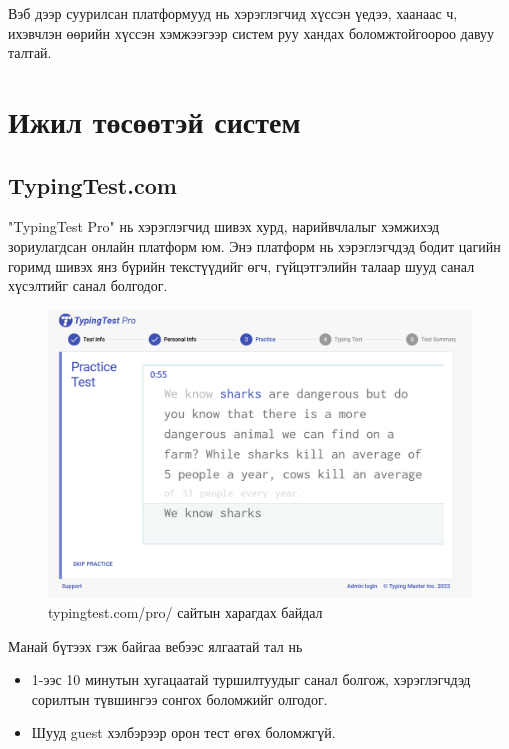 Вэб дээр суурилсан платформууд нь хэрэглэгчид хүссэн үедээ, хаанаас ч, ихэвчлэн өөрийн хүссэн хэмжээгээр систем руу хандах боломжтойгоороо давуу талтай.
\section{Ижил төсөөтэй систем}

\subsection{TypingTest.com}

"TypingTest Pro" нь хэрэглэгчид шивэх хурд, нарийвчлалыг хэмжихэд зориулагдсан онлайн платформ юм. Энэ платформ нь хэрэглэгчдэд бодит цагийн горимд шивэх янз бүрийн текстүүдийг өгч, гүйцэтгэлийн талаар шууд санал хүсэлтийг санал болгодог.

\begin{figure}[h]
	\centering
	\includegraphics[width=15cm]{images/typingtestpro.png}
	\caption{typingtest.com/pro/ сайтын харагдах байдал}
	\label{fig:alltop}
\end{figure}

Манай бүтээх гэж байгаа вебээс ялгаатай тал нь
\begin{itemize}
	\item 1-ээс 10 минутын хугацаатай туршилтуудыг санал болгож, хэрэглэгчдэд сорилтын түвшингээ сонгох боломжийг олгодог.
	\item Шууд guest хэлбэрээр орон тест өгөх боломжгүй.
\end{itemize}

